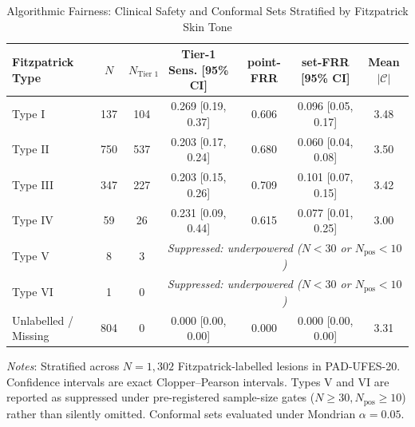 \begin{table}[t]
\caption{Algorithmic Fairness: Clinical Safety and Conformal Sets Stratified by Fitzpatrick Skin Tone}
\label{tab:fitzpatrick_fairness}
\centering
\footnotesize
\begin{tabular}{lcccccc}
\toprule
\textbf{Fitzpatrick Type} & $N$ & $N_{\text{Tier 1}}$ & \textbf{Tier-1 Sens.} [95\% CI] & \textbf{point-FRR} & \textbf{set-FRR} [95\% CI] & \textbf{Mean $|\mathcal{C}|$} \\
\midrule
Type I & 137 & 104 & 0.269 [0.19, 0.37] & 0.606 & 0.096 [0.05, 0.17] & 3.48 \\
Type II & 750 & 537 & 0.203 [0.17, 0.24] & 0.680 & 0.060 [0.04, 0.08] & 3.50 \\
Type III & 347 & 227 & 0.203 [0.15, 0.26] & 0.709 & 0.101 [0.07, 0.15] & 3.42 \\
Type IV & 59 & 26 & 0.231 [0.09, 0.44] & 0.615 & 0.077 [0.01, 0.25] & 3.00 \\
Type V & 8 & 3 & \multicolumn{4}{c}{\emph{Suppressed: underpowered ($N<30$ or $N_{\text{pos}}<10$)}} \\
Type VI & 1 & 0 & \multicolumn{4}{c}{\emph{Suppressed: underpowered ($N<30$ or $N_{\text{pos}}<10$)}} \\
Unlabelled / Missing & 804 & 0 & 0.000 [0.00, 0.00] & 0.000 & 0.000 [0.00, 0.00] & 3.31 \\
\bottomrule
\end{tabular}
\vspace{1mm}
\parbox{\linewidth}{\raggedright \emph{Notes}: Stratified across $N=1{,}302$ Fitzpatrick-labelled lesions in PAD-UFES-20. Confidence intervals are exact Clopper--Pearson intervals. Types V and VI are reported as suppressed under pre-registered sample-size gates ($N\ge 30, N_{\text{pos}}\ge 10$) rather than silently omitted. Conformal sets evaluated under Mondrian $\alpha=0.05$.}
\end{table}